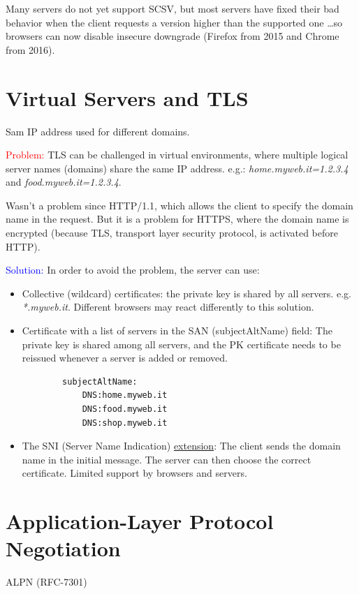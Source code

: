 \noindent Many servers do not yet support SCSV, but most servers have fixed their bad behavior when the client requests a version higher than the supported one \dots so browsers can now disable insecure downgrade (Firefox from 2015 and Chrome from 2016).

\section{Virtual Servers and TLS}
\begin{center}
    Sam IP address used for different domains.
\end{center}
\textcolor{red}{Problem: }TLS can be challenged in virtual environments, where multiple logical server names (domains) share the same IP address. e.g.: \textit{home.myweb.it=1.2.3.4} and \textit{food.myweb.it=1.2.3.4}.

Wasn't a problem since HTTP/1.1, which allows the client to specify the domain name in the request. But it is a problem for HTTPS, where the domain name is encrypted (because TLS, transport layer security protocol, is activated before HTTP).

\vspace{0.2cm}

\noindent \textcolor{Blue}{Solution: } In order to avoid the problem, the server can use:
\begin{itemize}
    \item Collective (wildcard) certificates: the private key is shared by all servers. e.g. \textit{*.myweb.it}.
    Different browsers may react differently to this solution.

    \item Certificate with a list of servers in the SAN (subjectAltName) field: The private key is shared among all servers, and the PK certificate needs to be reissued whenever a server is added or removed.
    \begin{verbatim}
        subjectAltName:
            DNS:home.myweb.it
            DNS:food.myweb.it
            DNS:shop.myweb.it
    \end{verbatim}
    \item The SNI (Server Name Indication) \underline{extension}: The client sends the domain name in the initial message. The server can then choose the correct certificate.
    Limited support by browsers and servers.
    
\end{itemize}


\section{Application-Layer Protocol Negotiation}
\begin{center}
    ALPN (RFC-7301)
\end{center}

